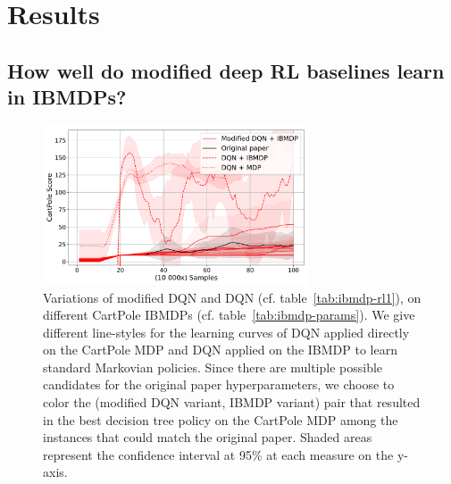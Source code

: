 \section{Results}

\subsection{How well do modified deep RL baselines learn in IBMDPs?}

\begin{figure}
    \centering
    \includegraphics[width=0.7\textwidth]{images/images_part1/dqn.pdf}
    \caption{Variations of modified DQN and DQN (cf. table~\ref{tab:ibmdp-rl1}), on different CartPole IBMDPs (cf. table~\ref{tab:ibmdp-params}). We give different line-styles for the learning curves of DQN applied directly on the CartPole MDP and DQN applied on the IBMDP to learn standard Markovian policies.
    Since there are multiple possible candidates for the original paper hyperparameters, we choose to color the (modified DQN variant, IBMDP variant) pair that resulted in the best decision tree policy on the CartPole MDP among the instances that could match the original paper.
    Shaded areas represent the confidence interval at 95\% at each measure on the y-axis.}
\end{figure}\label{fig:res-dqn}

